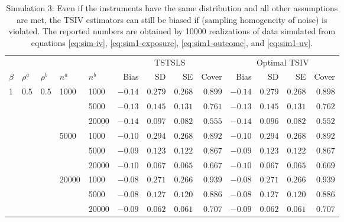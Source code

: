 \documentclass[preprint]{imsart}
\begin{document}
\begin{table}[ht]
  \centering
  \caption{Simulation 3: Even if the instruments have the same distribution and all
    other assumptions are met, the TSIV estimators can still be biased
    if  (sampling homogeneity of noise) is
    violated. The reported numbers
    are obtained by 10000 realizations of data simulated from equations \eqref{eq:sim-iv},
    \eqref{eq:sim1-exposure}, \eqref{eq:sim1-outcome}, and
    \eqref{eq:sim1-uv}.}
  \label{tab:sim3}
  \begin{tabular}{|lllll|rrrr|rrrr|}
    \hline
    & & & & & \multicolumn{4}{c|}{TSTSLS} &
    \multicolumn{4}{c|}{Optimal TSIV} \\
    $\beta$ & $\rho^a$ & $\rho^b$ & $n^a$ & $n^b$ & Bias & SD & SE & Cover &
    Bias & SD & SE & Cover \\
    \hline
    1 & 0.5 & 0.5 & 1000 & 1000  & $-0.14$ & $0.279$ & $0.268$ & $0.899$ & $-0.14$ & $0.279$ & $0.268$ & $0.898$ \\
    &  &  &  & 5000  & $-0.13$ & $0.145$ & $0.131$ & $0.761$ & $-0.13$ & $0.145$ & $0.131$ & $0.762$ \\
    &  &  &  & 20000  & $-0.14$ & $0.097$ & $0.082$ & $0.555$ & $-0.14$ & $0.096$ & $0.082$ & $0.552$ \\
    &  &  & 5000 & 1000  & $-0.10$ & $0.294$ & $0.268$ & $0.892$ & $-0.10$ & $0.294$ & $0.268$ & $0.892$ \\
    &  &  &  & 5000  & $-0.09$ & $0.123$ & $0.122$ & $0.867$ & $-0.09$ & $0.123$ & $0.122$ & $0.867$ \\
    &  &  &  & 20000  & $-0.10$ & $0.067$ & $0.065$ & $0.667$ & $-0.10$ & $0.067$ & $0.065$ & $0.669$ \\
    &  &  & 20000 & 1000  & $-0.08$ & $0.271$ & $0.266$ & $0.939$ & $-0.08$ & $0.271$ & $0.266$ & $0.939$ \\
    &  &  &  & 5000  & $-0.08$ & $0.127$ & $0.120$ & $0.886$ & $-0.08$ & $0.127$ & $0.120$ & $0.886$ \\
    &  &  &  & 20000  & $-0.09$ & $0.062$ & $0.061$ & $0.707$ & $-0.09$ &
    $0.062$ & $0.061$ & $0.707$ \\
    \hline
  \end{tabular}
\end{table}
\end{document}
